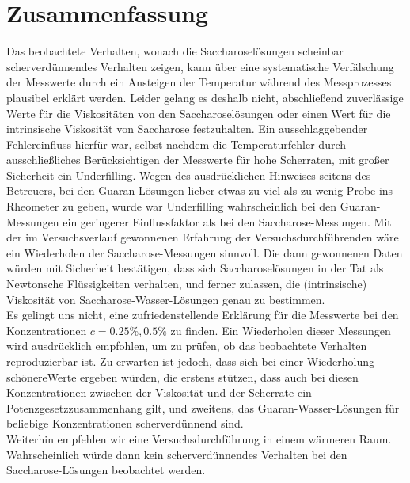 \documentclass[11pt,a4paper,oneside]{scrartcl}
\begin{document}
\newpage
\section{Zusammenfassung}
Das beobachtete Verhalten, wonach die Saccharoselösungen scheinbar scherverdünnendes Verhalten zeigen, kann über eine systematische Verfälschung der Messwerte durch ein Ansteigen der Temperatur während des Messprozesses plausibel erklärt werden. Leider gelang es deshalb nicht, abschließend zuverlässige Werte für die Viskositäten von den Saccharoselösungen oder einen Wert für die intrinsische Viskosität von Saccharose festzuhalten. Ein ausschlaggebender Fehlereinfluss hierfür war, selbst nachdem die Temperaturfehler durch ausschließliches Berücksichtigen der Messwerte für hohe Scherraten, mit großer Sicherheit ein Underfilling. Wegen des ausdrücklichen Hinweises seitens des Betreuers, bei den Guaran-Lösungen lieber etwas zu viel als zu wenig Probe ins Rheometer zu geben, wurde war Underfilling wahrscheinlich bei den Guaran-Messungen ein geringerer Einflussfaktor als bei den Saccharose-Messungen. Mit der im Versuchsverlauf gewonnenen Erfahrung der Versuchsdurchführenden wäre ein Wiederholen der Saccharose-Messungen sinnvoll. Die dann gewonnenen Daten würden mit Sicherheit bestätigen, dass sich Saccharoselösungen in der Tat als Newtonsche Flüssigkeiten verhalten, und ferner zulassen, die (intrinsische) Viskosität von Saccharose-Wasser-Lösungen genau zu bestimmen.\\
Es gelingt uns nicht, eine zufriedenstellende Erklärung für die Messwerte bei den Konzentrationen $c=0.25\%,0.5\%$ zu finden. Ein Wiederholen dieser Messungen wird ausdrücklich empfohlen, um zu prüfen, ob das beobachtete Verhalten reproduzierbar ist. Zu erwarten ist jedoch, dass sich bei einer Wiederholung \glqq schönere\Grqq Werte ergeben würden, die erstens stützen, dass auch bei diesen Konzentrationen zwischen der Viskosität und der Scherrate ein Potenzgesetzzusammenhang gilt, und zweitens, das Guaran-Wasser-Lösungen für beliebige Konzentrationen scherverdünnend sind. \\
Weiterhin empfehlen wir eine Versuchsdurchführung in einem wärmeren Raum. Wahrscheinlich würde dann kein scherverdünnendes Verhalten bei den Saccharose-Lösungen beobachtet werden.
\end{document}
